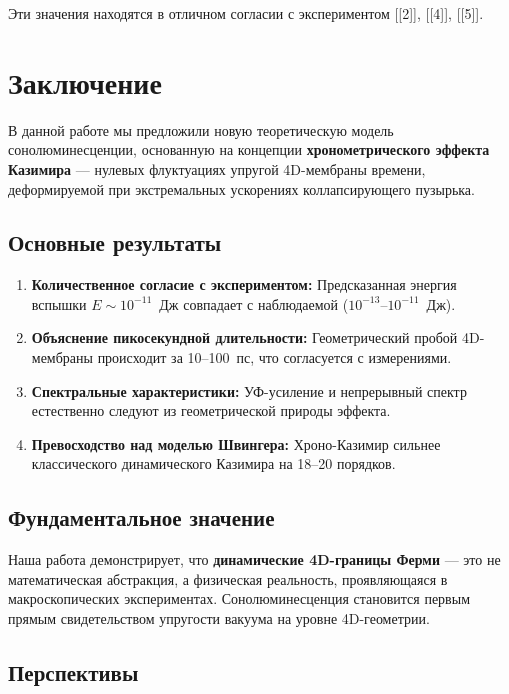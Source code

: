 \documentclass[12pt,a4paper]{article}
\begin{document}
Эти значения находятся в отличном согласии с экспериментом [[2]], [[4]], [[5]].

\section{Заключение}
\label{sec:conclusion}

В данной работе мы предложили новую теоретическую модель сонолюминесценции, основанную на концепции \textbf{хронометрического эффекта Казимира} — нулевых флуктуациях упругой 4D-мембраны времени, деформируемой при экстремальных ускорениях коллапсирующего пузырька.

\subsection{Основные результаты}

\begin{enumerate}
    \item \textbf{Количественное согласие с экспериментом:} Предсказанная энергия вспышки $E \sim 10^{-11}$~Дж совпадает с наблюдаемой ($10^{-13}$--$10^{-11}$~Дж).
    
    \item \textbf{Объяснение пикосекундной длительности:} Геометрический пробой 4D-мембраны происходит за 10--100~пс, что согласуется с измерениями.
    
    \item \textbf{Спектральные характеристики:} УФ-усиление и непрерывный спектр естественно следуют из геометрической природы эффекта.
    
    \item \textbf{Превосходство над моделью Швингера:} Хроно-Казимир сильнее классического динамического Казимира на 18--20 порядков.
\end{enumerate}

\subsection{Фундаментальное значение}

Наша работа демонстрирует, что \textbf{динамические 4D-границы Ферми} — это не математическая абстракция, а физическая реальность, проявляющаяся в макроскопических экспериментах. Сонолюминесценция становится первым прямым свидетельством упругости вакуума на уровне 4D-геометрии.

\subsection{Перспективы}
\end{document}

